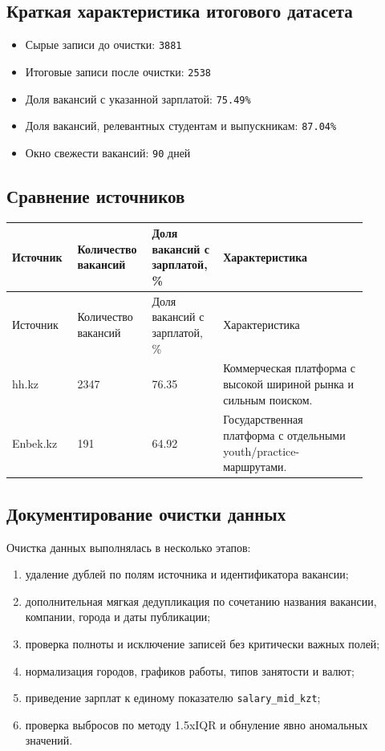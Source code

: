 \documentclass[12pt,a4paper]{article}
\begin{document}
\subsection{Краткая характеристика итогового датасета}
\begin{itemize}
\item Сырые записи до очистки: \texttt{3881}
\item Итоговые записи после очистки: \texttt{2538}
\item Доля вакансий с указанной зарплатой: \texttt{75.49\%}
\item Доля вакансий, релевантных студентам и выпускникам: \texttt{87.04\%}
\item Окно свежести вакансий: \texttt{90} дней
\end{itemize}

\subsection{Сравнение источников}
\begin{longtable}{p{0.16\linewidth}p{0.16\linewidth}p{0.18\linewidth}p{0.38\linewidth}}
\toprule
Источник & Количество вакансий & Доля вакансий с зарплатой, \% & Характеристика\\
\midrule
\endfirsthead
\toprule
Источник & Количество вакансий & Доля вакансий с зарплатой, \% & Характеристика\\
\midrule
\endhead
hh.kz & 2347 & 76.35 & Коммерческая платформа с высокой шириной рынка и сильным поиском.\\
Enbek.kz & 191 & 64.92 & Государственная платформа с отдельными youth/practice-маршрутами.\\
\bottomrule
\end{longtable}

\subsection{Документирование очистки данных}
Очистка данных выполнялась в несколько этапов:
\begin{enumerate}
\item удаление дублей по полям источника и идентификатора вакансии;
\item дополнительная мягкая дедупликация по сочетанию названия вакансии, компании, города и даты публикации;
\item проверка полноты и исключение записей без критически важных полей;
\item нормализация городов, графиков работы, типов занятости и валют;
\item приведение зарплат к единому показателю \texttt{salary\_mid\_kzt};
\item проверка выбросов по методу 1.5xIQR и обнуление явно аномальных значений.
\end{enumerate}
\end{document}
